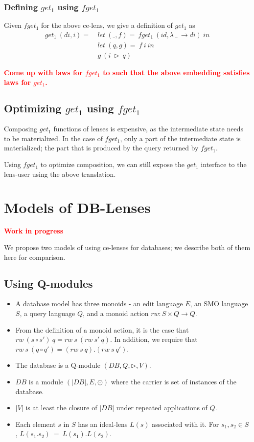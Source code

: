 \documentclass[a4paper,10pt]{article}
\newcommand{\finish}[1]{#1}
\newcommand{\comment}[1]{\finish{\textbf{\textcolor{red}{#1}}}}
\begin{document}
\subsubsection{Defining  $get_1$ using $fget_1$}
Given $fget_1$ for the above ce-lens, we give a definition of $get_1$
as
\begin{align*}
get_1~(di,i) =~&let~(\_,f) =~fget_1~(id,\lambda~\_~\to di)~in\\
                       &let~(q,g) =~f~i~in \\
                       &g~(i~\rhd~q)
\end{align*}


\comment{Come up with laws for $fget_1$ to such that the above
  embedding satisfies laws for $get_1$.}

\subsection{Optimizing $get_1$ using $fget_1$}
  Composing $get_1$ functions of lenses is expensive, as the intermediate state needs to be materialized. In the case of $fget_1$, only a part of the intermediate state is materialized; the part that is produced by the query returned by $fget_1$.
  
  Using $fget_1$ to optimize composition, we can still expose the $get_1$ interface to the lens-user using the above translation.
  
\section{Models of DB-Lenses}
\comment{Work in progress}

  We propose two models of using ce-lenses for databases; we describe both of them here for comparison.
  
\subsection{Using Q-modules}
\begin{itemize}
\item A database model has three monoids - an edit language $E$, an SMO language $S$, a query language $Q$, and a monoid action $rw : S \times Q \to Q$.
 
\item From the definition of a monoid action, it is the case that $rw~(s \circ s')~q = rw~s~(rw~s'~q)$. In addition, we require that $rw~s~(q \circ q') = (rw~s~q). (rw~s~q')$.
\item The database is a Q-module $(DB,Q,\rhd,V)$.
\item $DB$ is a module $(|DB|,E,\odot)$ where the carrier is set of instances of the database.
\item $|V|$ is at least the closure of $|DB|$ under repeated applications of $Q$.
\item Each element $s$ in $S$ has an ideal-lens $L(s)$ associated with it. For $s_1,s_2 \in S$, $L(s_1 . s_2) ~=~ L(s_1) . L(s_2)$.
\end{itemize}
\end{document}
